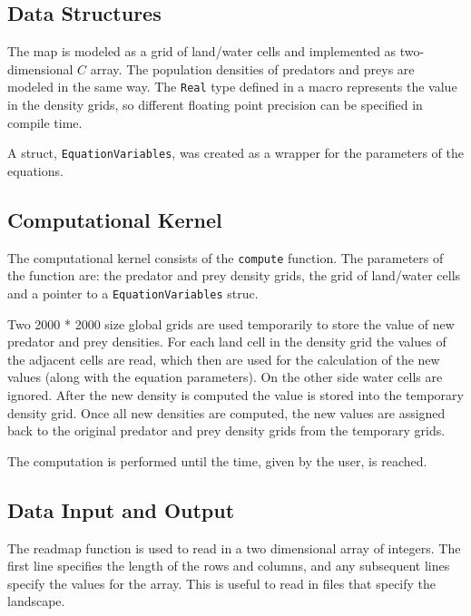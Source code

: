 \documentclass[12pt,a4paper]{article}
\begin{document}
\subsection{Data Structures}

The map is modeled as a grid of land/water cells and implemented as two-dimensional $C$ array. The population densities of predators and preys are modeled in the same way. The \texttt{Real} type defined in a macro represents the value in the density grids, so different floating point precision  can be specified in compile time. 

A struct, \texttt{EquationVariables}, was created as a wrapper for the parameters of the equations.

\subsection{Computational Kernel}

The computational kernel consists of the \texttt{compute} function. The parameters of the function are: the predator and prey density grids, the grid of land/water cells and a pointer to a \texttt{EquationVariables} struc. 

Two 2000 * 2000 size global grids are used temporarily to store the value of new predator and prey densities. For each land cell in the density grid the values of the adjacent cells are read, which then are used for the calculation of the new values (along with the equation parameters). On the other side water cells are ignored. After the new density is computed the value is stored into the temporary density grid. Once all new densities are computed, the new values are assigned back to the original predator and prey density grids from the temporary grids.

The computation is performed until the time, given by the user, is reached.


\subsection{Data Input and Output}

The readmap function is used to read in a two dimensional array of integers. The first line specifies the length of the rows and columns, and any subsequent lines specify the values for the array. This is useful to read in files that specify the landscape.
\end{document}
